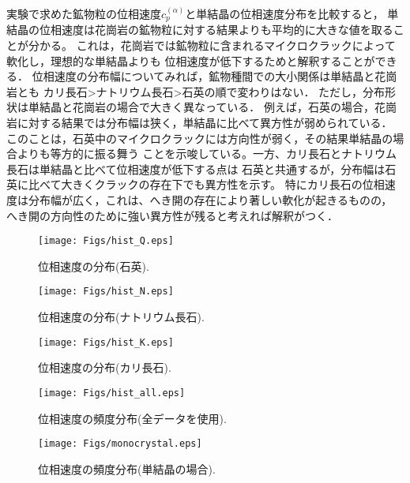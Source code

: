 実験で求めた鉱物粒の位相速度$c^{(\alpha)}_p$と単結晶の位相速度分布を比較すると，
単結晶の位相速度は花崗岩の鉱物粒に対する結果よりも平均的に大きな値を取ることが分かる。
これは，花崗岩では鉱物粒に含まれるマイクロクラックによって軟化し，理想的な単結晶よりも
位相速度が低下するためと解釈することができる．
位相速度の分布幅についてみれば，鉱物種間での大小関係は単結晶と花崗岩とも
カリ長石>ナトリウム長石>石英の順で変わりはない．
ただし，分布形状は単結晶と花崗岩の場合で大きく異なっている．
例えば，石英の場合，花崗岩に対する結果では分布幅は狭く，単結晶に比べて異方性が弱められている．
このことは，石英中のマイクロクラックには方向性が弱く，その結果単結晶の場合よりも等方的に振る舞う
ことを示唆している。一方、カリ長石とナトリウム長石は単結晶と比べて位相速度が低下する点は
石英と共通するが，分布幅は石英に比べて大きくクラックの存在下でも異方性を示す。
特にカリ長石の位相速度は分布幅が広く，これは、へき開の存在により著しい軟化が起きるものの，
へき開の方向性のために強い異方性が残ると考えれば解釈がつく．
\begin{figure}
\begin{center}
	\texttt{[image: Figs/hist\_Q.eps]}
	\caption{位相速度の分布(石英).}
	\label{fig:fig10}
\end{center}
	\vspace{-10mm}
\end{figure}
\begin{figure}
\begin{center}
	\texttt{[image: Figs/hist\_N.eps]}
	\caption{位相速度の分布(ナトリウム長石).}
	\label{fig:fig11}
\end{center}
	\vspace{-10mm}
\end{figure}
\begin{figure}
\begin{center}
	\texttt{[image: Figs/hist\_K.eps]}
	\caption{位相速度の分布(カリ長石).}
	\label{fig:fig12}
\end{center}
	\vspace{-10mm}
\end{figure}
\begin{figure}
\begin{center}
	\texttt{[image: Figs/hist\_all.eps]}
	\caption{位相速度の頻度分布(全データを使用).}
	\label{fig:fig13}
\end{center}
	\vspace{-10mm}
\end{figure}
\begin{figure}
\begin{center}
	\texttt{[image: Figs/monocrystal.eps]}
	\caption{位相速度の頻度分布(単結晶の場合).}
	\label{fig:fig14}
\end{center}
	\vspace{-10mm}
\end{figure}

